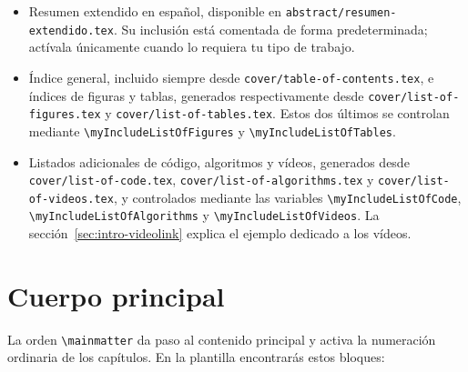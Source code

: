 \begin{itemize}
  \item Resumen extendido en español, disponible en \texttt{abstract/resumen-extendido.tex}. Su inclusión está comentada de forma predeterminada; actívala únicamente cuando lo requiera tu tipo de trabajo.
  \item Índice general, incluido siempre desde \texttt{cover/table-of-contents.tex}, e índices de figuras y tablas, generados respectivamente desde \texttt{cover/list-of-figures.tex} y \texttt{cover/list-of-tables.tex}. Estos dos últimos se controlan mediante \texttt{\textbackslash{}myIncludeListOfFigures} y \texttt{\textbackslash{}myIncludeListOfTables}.
  \item Listados adicionales de código, algoritmos y vídeos, generados desde \texttt{cover/list-of-code.tex}, \texttt{cover/list-of-algorithms.tex} y \texttt{cover/list-of-videos.tex}, y controlados mediante las variables \texttt{\textbackslash{}myIncludeListOfCode}, \texttt{\textbackslash{}myIncludeListOfAlgorithms} y \texttt{\textbackslash{}myIncludeListOfVideos}. La sección~\ref{sec:intro-videolink} explica el ejemplo dedicado a los vídeos.
\end{itemize}

\section{Cuerpo principal}
\label{sec:cuerpo-principal}

La orden \texttt{\textbackslash{}mainmatter} da paso al contenido principal y activa la numeración ordinaria de los capítulos. En la plantilla encontrarás estos bloques:

